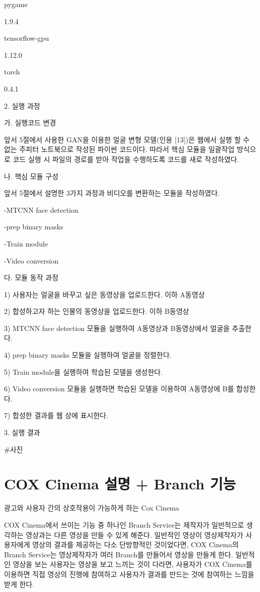 \documentclass{oblivoir}
\begin{document}
pygame

1.9.4

tensorflow-gpu

1.12.0

torch

0.4.1

2. 실행 과정

 가. 실행코드 변경

  앞서 5절에서 사용한 GAN을 이용한 얼굴 변형 모델(인용 [13])은 웹에서 실행 할 수 없는 주피터 노트북으로 작성된 파이썬 코드이다. 따라서 핵심 모듈을 일괄작업 방식으로 코드 실행 시 파일의 경로를 받아 작업을 수행하도록 코드를 새로 작성하였다.

 나. 핵심 모듈 구성

  앞서 5절에서 설명한 3가지 과정과 비디오를 변환하는 모듈을 작성하였다.

  -MTCNN face detection

  -prep binary masks

  -Train module

  -Video conversion

 다. 모듈 동작 과정

   1) 사용자는 얼굴을 바꾸고 싶은 동영상을 업로드한다. 이하 A동영상

   2) 합성하고자 하는 인물의 동영상을 업로드한다. 이하 B동영상

   3) MTCNN face detection 모듈을 실행하여 A동영상과 B동영상에서 얼굴을 추출한다.

   4) prep binary masks 모듈을 실행하여 얼굴을 정렬한다.

   5) Train module을 실행하여 학습된 모델을 생성한다.

   6) Video conversion 모듈을 실행하면 학습된 모델을 이용하여 A동영상에 B를 합성한다.

   7) 합성한 결과를 웹 상에 표시한다.

3. 실행 결과

#사진


\section{ COX Cinema 설명 + Branch 기능}

광고와 사용자 간의 상호작용이 가능하게 하는 Cox Cinema  

COX Cinema에서 쓰이는 기능 중 하나인 Branch Service는 제작자가 일반적으로 생각하는 영상과는 다른 영상을 만들 수 있게 해준다. 일반적인 영상이 영상제작자가 사용자에게 영상의 결과를 제공하는 다소 단방향적인 것이었다면, COX Cinema의 Branch Service는 영상제작자가 여러 Branch를 만들어서 영상을 만들게 한다. 일반적인 영상을 보는 사용자는 영상을 보고 느끼는 것이 다라면, 사용자가 COX Cinema를 이용하면 직접 영상의 진행에 참여하고 사용자가 결과를 만드는 것에 참여하는 느낌을 받게 한다.     
\end{document}
